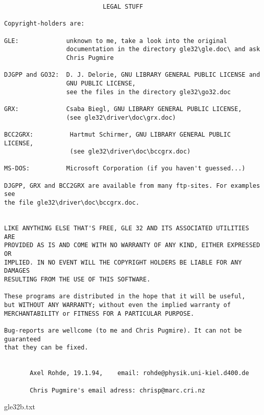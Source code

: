\begin{center}
\begin{minipage}[t]{11.0cm}
{\scriptsize
\begin{verbatim}
                           LEGAL STUFF

Copyright-holders are:

GLE:             unknown to me, take a look into the original
                 documentation in the directory gle32\gle.doc\ and ask
                 Chris Pugmire

DJGPP and GO32:  D. J. Delorie, GNU LIBRARY GENERAL PUBLIC LICENSE and
                 GNU PUBLIC LICENSE,
                 see the files in the directory gle32\go32.doc

GRX:             Csaba Biegl, GNU LIBRARY GENERAL PUBLIC LICENSE,
                 (see gle32\driver\doc\grx.doc)
		  
BCC2GRX:          Hartmut Schirmer, GNU LIBRARY GENERAL PUBLIC LICENSE,
                  (see gle32\driver\doc\bccgrx.doc)

MS-DOS:          Microsoft Corporation (if you haven't guessed...)

DJGPP, GRX and BCC2GRX are available from many ftp-sites. For examples see
the file gle32\driver\doc\bccgrx.doc.


LIKE ANYTHING ELSE THAT'S FREE, GLE 32 AND ITS ASSOCIATED UTILITIES ARE
PROVIDED AS IS AND COME WITH NO WARRANTY OF ANY KIND, EITHER EXPRESSED OR
IMPLIED. IN NO EVENT WILL THE COPYRIGHT HOLDERS BE LIABLE FOR ANY DAMAGES
RESULTING FROM THE USE OF THIS SOFTWARE.
 
These programs are distributed in the hope that it will be useful,
but WITHOUT ANY WARRANTY; without even the implied warranty of
MERCHANTABILITY or FITNESS FOR A PARTICULAR PURPOSE.

Bug-reports are wellcome (to me and Chris Pugmire). It can not be guaranteed
that they can be fixed.


       Axel Rohde, 19.1.94,    email: rohde@physik.uni-kiel.d400.de

       Chris Pugmire's email adress: chrisp@marc.cri.nz 
\end{verbatim}
}
\hfill {\small gle32b.txt}\\
\end{minipage}
\end{center}
